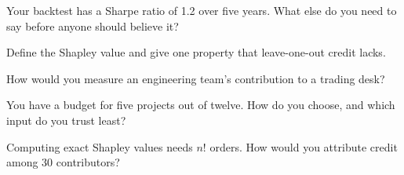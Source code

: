 \begin{interviewq}\label{iq:fm:managing-researchers-traders-and-engineers:2}
Your backtest has a Sharpe ratio of 1.2 over five years. What else do you need to say before anyone should believe it?
\end{interviewq}

\begin{interviewq}\label{iq:fm:managing-researchers-traders-and-engineers:3}
Define the Shapley value and give one property that leave-one-out credit lacks.
\end{interviewq}

\begin{interviewq}\label{iq:fm:managing-researchers-traders-and-engineers:4}
How would you measure an engineering team's contribution to a trading desk?
\end{interviewq}

\begin{interviewq}\label{iq:fm:managing-researchers-traders-and-engineers:5}
You have a budget for five projects out of twelve. How do you choose, and which input do you trust least?
\end{interviewq}

\begin{interviewq}\label{iq:fm:managing-researchers-traders-and-engineers:6}
Computing exact Shapley values needs $n!$ orders. How would you attribute credit among 30 contributors?
\end{interviewq}
